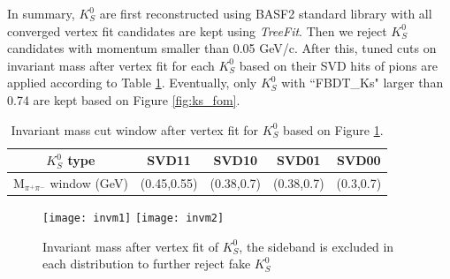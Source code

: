 In summary, $K_S^0$ are first reconstructed using BASF2 standard library with all converged vertex fit candidates are kept using \textit{TreeFit}. Then we reject $K_S^0$ candidates with momentum smaller than 0.05 GeV/c. After this, tuned cuts on invariant mass after vertex fit for each $K_S^0$ based on their SVD hits of pions are applied according to Table \ref{tab:ks_invm}. 
Eventually, only $K_S^0$ with ``FBDT\_Ks" larger than 0.74 are kept based on Figure \ref{fig:ks_fom}.
 
\begin{table}[h]
	\centering 
	\begin{tabular}{|c|c|c|c|c|} 
		\hline
		$K_S^0$ type & SVD11 & SVD10 & SVD01  & SVD00  \\
		\hline
		M$_{\pi^+\pi^-}$ window (GeV) & (0.45,0.55) & (0.38,0.7)  & (0.38,0.7)  & (0.3,0.7) \\
		\hline
	\end{tabular}
\caption{Invariant mass cut window after vertex fit for $K_S^0$ based on Figure \ref{fig:invm}.}
\label{tab:ks_invm}
\end{table}

\begin{figure}[htpb]
	\centering
	\texttt{[image: invm1]}
	\texttt{[image: invm2]}
	\caption{Invariant mass after vertex fit of $K_S^0$, the sideband is excluded in each distribution to further reject fake $K_S^0$}
	\label{fig:invm}
\end{figure}


